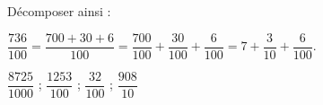 \begin{exercice}
    Décomposer ainsi : 
    
    $\dfrac{736}{100} = \dfrac{700 + 30 + 6}{100} = \dfrac{700}{100} + \dfrac{30}{100} + \dfrac{6}{100} = 7+\dfrac{3}{10}+\dfrac{6}{100}$.
    \begin{center}
       $\dfrac{\num{8725}}{\num{1000}}$ \; ; \; $\dfrac{\num{1253}}{100}$ \; ; \; $\dfrac{32}{100}$ \; ; \; $\dfrac{908}{10}$
    \end{center}
 \end{exercice}

